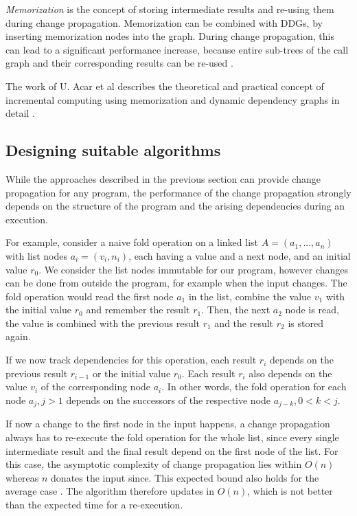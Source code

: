 \textit{Memorization} is the concept of storing intermediate results and re-using them during change propagation. Memorization can be combined with DDGs, by inserting memorization nodes into the graph. During change propagation, this can lead to a significant performance increase, because entire sub-trees of the call graph and their corresponding results can be re-used \cite{Acar2005thesis}.

The work of U. Acar et al describes the theoretical and practical concept of incremental computing using memorization and dynamic dependency graphs in detail \cite{Acar2005thesis}.

\subsection{Designing suitable algorithms}

While the approaches described in the previous section can provide change propagation for any program, the performance of the change propagation strongly depends on the structure of the program and the arising dependencies during an execution. 

For example, consider a naive fold operation on a linked list $A = (a_1, ..., a_n)$ with list nodes $a_i = (v_i, n_i)$, each having a value and a next node, and an initial value $r_0$. We consider the list nodes immutable for our program, however changes can be done from outside the program, for example when the input changes. The fold operation would read the first node $a_1$ in the list, combine the value $v_1$ with the initial value $r_0$ and remember the result $r_1$. Then, the next $a_2$ node is read, the value is combined with the previous result $r_1$ and the result $r_2$ is stored again. 

If we now track dependencies for this operation, each result $r_i$ depends on the previous result $r_{i - 1}$ or the initial value $r_0$. Each result $r_i$ also depends on the value $v_i$ of the corresponding node $a_i$. In other words, the fold operation for each node $a_j, j > 1$ depends on the successors of the respective node $a_{j - k}, 0 < k < j$.

If now a change to the first node in the input happens, a change propagation always has to re-execute the fold operation for the whole list, since every single intermediate result and the final result depend on the first node of the list. For this case, the asymptotic complexity of change propagation lies within $O(n)$ whereas $n$ donates the input since. This expected bound also holds for the average case \cite{Acar2005thesis}. The algorithm therefore updates in $O(n)$, which is not better than the expected time for a re-execution. 


